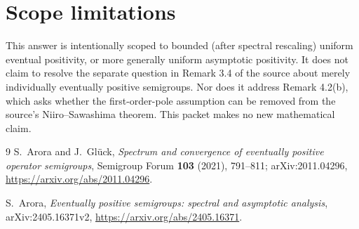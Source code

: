 \documentclass[11pt]{article}
\begin{document}
\section*{Scope limitations}

This answer is intentionally scoped to bounded (after spectral rescaling)
uniform eventual positivity, or more generally uniform asymptotic positivity.
It does not claim to resolve the separate question in Remark 3.4 of the source
about merely individually eventually positive semigroups.  Nor does it address
Remark 4.2(b), which asks whether the first-order-pole assumption can be
removed from the source's Niiro--Sawashima theorem.  This packet makes no new
mathematical claim.

\begin{thebibliography}{9}
S.~Arora and J.~Gl\"uck,
\emph{Spectrum and convergence of eventually positive operator semigroups},
Semigroup Forum \textbf{103} (2021), 791--811;
arXiv:2011.04296,
\url{https://arxiv.org/abs/2011.04296}.

S.~Arora,
\emph{Eventually positive semigroups: spectral and asymptotic analysis},
arXiv:2405.16371v2,
\url{https://arxiv.org/abs/2405.16371}.
\end{thebibliography}
\end{document}

